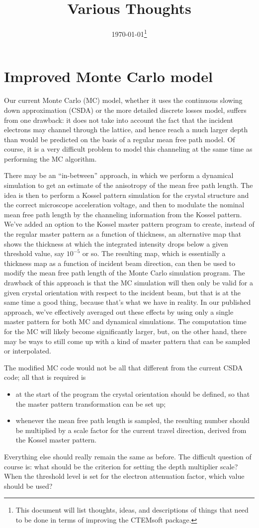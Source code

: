 \documentclass[DIV=calc, paper=letter, fontsize=11pt]{scrartcl}	 %
\title{Various Thoughts} %
\author{\vspace*{-0.7in}} %
\date{\today\protect\footnote{This document will list thoughts, ideas, and descriptions of things that need to be done in terms of improving the CTEMsoft package.}}
\begin{document}
\maketitle

\section{Improved Monte Carlo model}
Our current Monte Carlo (MC) model, whether it uses the continuous slowing down approximation (CSDA) or the more detailed discrete losses model,
suffers from one drawback: it does not take into account the fact that the incident electrons may channel through the lattice, and hence reach a 
much larger depth than would be predicted on the basis of a regular mean free path model.  Of course, it is a very difficult problem to model this channeling 
at the same time as performing the MC algorithm.  

There may be an ``in-between'' approach, in which we perform a dynamical simulation to get an estimate of the anisotropy of the mean free path length.  The idea is
then to perform a Kossel pattern simulation for the crystal structure and the correct microscope acceleration voltage, and then to modulate the nominal 
mean free path length by the channeling information from the Kossel pattern.  We've added an option to the Kossel master pattern program to create, instead of the regular master pattern as a function of thickness, an alternative map that shows the thickness at which the integrated intensity drops below a given threshold value, say
$10^{-5}$ or so.  The resulting map, which is essentially a thickness map as a function of incident beam direction, can then be used to modify the mean
free path length of the Monte Carlo simulation program.  The drawback of this approach is that the MC simulation will then only be valid for a given crystal
orientation with respect to the incident beam, but that is at the same time a good thing, because that's what we have in reality. In our published approach, we've
effectively averaged out these effects by using only a single master pattern for both MC and dynamical simulations.  The computation time for the MC will likely become significantly larger, but, on the other hand, there may be ways to still come up with a kind of master pattern that can be sampled or interpolated.

The modified MC code would not be all that different from the current CSDA code; all that is required is 
\begin{itemize}
\item at the start of the program the crystal orientation should be defined, so that the master pattern transformation can be set up;
\item whenever the mean free path length is sampled, the resulting number should be multiplied by a scale factor for the current travel direction, derived from the Kossel master pattern.
\end{itemize}
Everything else should really remain the same as before.  The difficult question of course is: what should be the criterion for setting the depth multiplier scale? When the 
threshold level is set for the electron attenuation factor, which value should be used?  
\end{document}
